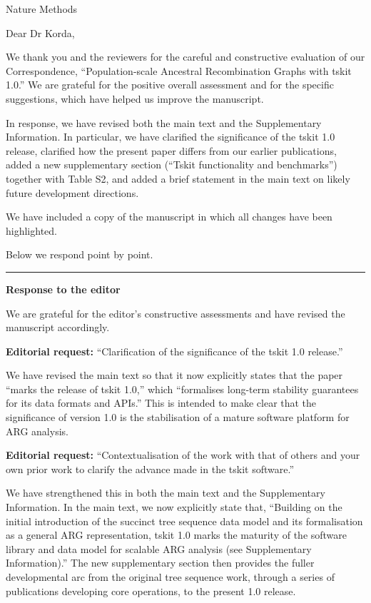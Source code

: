 \documentclass{letter}
\begin{document}
\begin{letter}{Nature Methods}

\opening{Dear Dr Korda,}

We thank you and the reviewers for the careful and constructive evaluation of
our Correspondence, ``Population-scale Ancestral Recombination Graphs with
tskit 1.0.'' We are grateful for the positive overall assessment and for the
specific suggestions, which have helped us improve the manuscript.

In response, we have revised both the main text and the Supplementary
Information. In particular, we have clarified the significance of the tskit 1.0
release, clarified how the present paper differs from our earlier publications,
added a new supplementary section (``Tskit functionality and benchmarks'')
together with Table S2, and added a brief statement in the main text on likely
future development directions.

We have included a copy of the manuscript in which all changes have been
highlighted.

Below we respond point by point.

\medskip
\hrule
\medskip

\noindent \textbf{Response to the editor}

We are grateful for the editor’s constructive assessments
and have revised the manuscript accordingly.

\noindent \textbf{Editorial request:} ``Clarification of the significance of the tskit 1.0 release.''

We have revised the main text so that it now explicitly states that
the paper ``marks the release of tskit 1.0,'' which ``formalises long-term
stability guarantees for its data formats and APIs.'' This is intended to make
clear that the significance of version 1.0 is the stabilisation of a mature
software platform for ARG analysis.

\noindent \textbf{Editorial request:} ``Contextualisation of the work with that
of others and your own prior work to clarify the advance made in the tskit
software.''

We have strengthened this in both the main text and the Supplementary
Information. In the main text, we now explicitly state that, ``Building on the
initial introduction of the succinct tree sequence data model and its
formalisation as a general ARG representation, tskit 1.0 marks the maturity
of the software library and data model for scalable ARG analysis (see
Supplementary Information).'' The new supplementary section then provides the
fuller developmental arc from the original tree sequence work, through
a series of publications developing core operations, to the present 1.0 release.


\end{letter}
\end{document}
